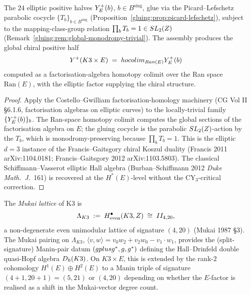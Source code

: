 \begin{proposition}
\label{gluing:prop:24-assembly}
The $24$ elliptic positive halves $Y^{+}_E(b)$, $b \in
B^{\mathrm{sing}}$, glue via the Picard--Lefschetz parabolic cocycle
$\{T_b\}_{b \in B^{\mathrm{sing}}}$ (Proposition~\ref{gluing:prop:picard-lefschetz}),
subject to the mapping-class-group relation $\prod_{b} T_b = 1 \in
SL_2(Z)$ (Remark~\ref{gluing:rem:global-monodromy-trivial}). The assembly
produces the global chiral positive half
\[
 Y^{+}(K3 \times E) \;=\;
 hocolim_{Ran(E)} Y^{+}_E(b)
\]
computed as a factorisation-algebra homotopy colimit over the Ran
space $\mathrm{Ran}(E)$, with the elliptic factor supplying the
chiral structure.
\end{proposition}

\begin{proof}
Apply the Costello--Gwilliam factorisation-homology machinery
(CG Vol II \S 6.1.6, factorisation algebras on elliptic curves)
to the locally-trivial family $\{Y^{+}_E(b)\}_{b}$. The Ran-space
homotopy colimit computes the global sections of the factorisation
algebra on $E$; the gluing cocycle is the parabolic $SL_2(Z)$-action
by the $T_b$, which is monodromy-preserving because
$\prod_b T_b = 1$. This is the elliptic $d = 3$ instance of the
Francis--Gaitsgory chiral Koszul duality (Francis 2011 arXiv:1104.0181;
Francis--Gaitsgory 2012 arXiv:1103.5803). The classical
Schiffmann--Vasserot elliptic Hall algebra (Burban--Schiffmann 2012
\emph{Duke Math.\ J.}~161) is recovered at the $H^*(E)$-level
without the CY$_3$-critical correction.
\end{proof}

\begin{definition}
\label{gluing:def:mukai-manin-pair}
The \emph{Mukai lattice} of K3 is
\[
 \Lambda_{K3} \;:=\; H^\bullet_{\text{even}}(K3, Z)
 \;\cong\; II_{4,20},
\]
a non-degenerate even unimodular lattice of signature $(4, 20)$
(Mukai 1987 \S 3). The Mukai pairing on $\Lambda_{K3}$,
$\langle v, w \rangle = v_0 w_2 + v_2 w_0 - v_1 \cdot w_1$,
provides the (split-signature) Manin-pair datum
$(g plus g^*, g, g^*)$ defining the Hall--Drinfeld double
quasi-Hopf algebra $D_\hbar(K3)$. On $K3 \times E$, this is
extended by the rank-$2$ cohomology $H^1(E) \oplus H^2(E)$ to a
Manin triple of signature $(4+1, 20+1) = (5, 21)$ or $(4,20)$
depending on whether the $E$-factor is realised as a shift in the
Mukai-vector degree count.
\end{definition}

